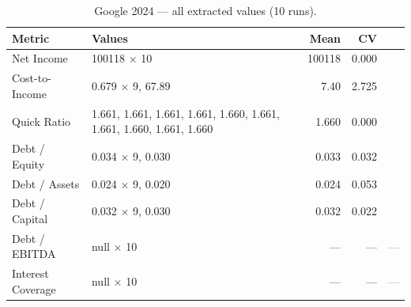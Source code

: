 \documentclass[12pt, a4paper]{article}
\newcommand{\cmark}{\textcolor{green!60!black}{\ding{51}}}  %
\newcommand{\xmark}{\textcolor{red!70!black}{\ding{55}}}    %
\newcommand{\nmark}{\textcolor{gray}{---}}                   %
\begin{document}
\begin{table}[H]
\centering\small
\caption{Google 2024 --- all extracted values (10 runs).}
\label{tab:goo-raw}
\begin{tabular}{lp{8.5cm}rrc}
\toprule
\textbf{Metric} & \textbf{Values} & \textbf{Mean} & \textbf{CV} & \\
\midrule
Net Income         & 100118 $\times$ 10                                                & 100118 & 0.000 & \cmark \\
Cost-to-Income     & 0.679 $\times$ 9, 67.89                                           &   7.40 & 2.725 & \xmark \\
Quick Ratio        & 1.661, 1.661, 1.661, 1.661, 1.660, 1.661, 1.661, 1.660, 1.661, 1.660 &  1.660 & 0.000 & \cmark \\
Debt / Equity      & 0.034 $\times$ 9, 0.030                                           &  0.033 & 0.032 & \cmark \\
Debt / Assets      & 0.024 $\times$ 9, 0.020                                           &  0.024 & 0.053 & \xmark \\
Debt / Capital     & 0.032 $\times$ 9, 0.030                                           &  0.032 & 0.022 & \cmark \\
Debt / EBITDA      & null $\times$ 10                                                  &  ---   &  ---  & \nmark \\
Interest Coverage  & null $\times$ 10                                                  &  ---   &  ---  & \nmark \\
\bottomrule
\end{tabular}
\end{table}
\end{document}
